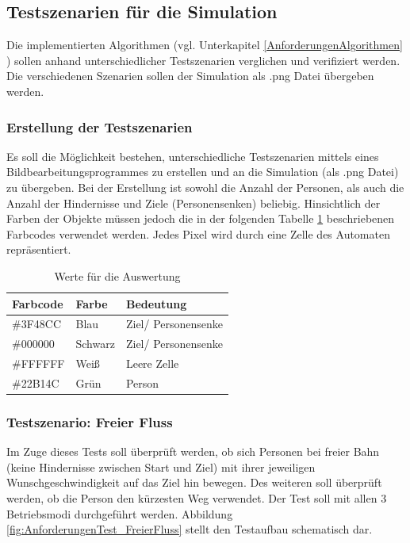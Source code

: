 \subsection{Testszenarien für die Simulation}
\label{AnforderungenTest}

Die implementierten Algorithmen (vgl. Unterkapitel \ref{AnforderungenAlgorithmen} ) sollen anhand unterschiedlicher Testszenarien verglichen und verifiziert werden. Die verschiedenen Szenarien sollen der Simulation als .png Datei übergeben werden. 

\subsubsection{Erstellung der Testszenarien}
Es soll die Möglichkeit bestehen, unterschiedliche Testszenarien mittels eines Bildbearbeitungsprogrammes zu erstellen und an die Simulation (als .png Datei) zu übergeben. Bei der Erstellung ist sowohl die Anzahl der Personen, als auch die Anzahl der Hindernisse und Ziele (Personensenken) beliebig. Hinsichtlich der Farben der Objekte müssen jedoch die in der folgenden Tabelle \ref{tab:Farbcodes} beschriebenen Farbcodes verwendet werden. Jedes Pixel wird durch eine Zelle des Automaten repräsentiert.
 
\begin{table}[htpb]
	\centering
	\begin{tabular}{lll}
		Farbcode & Farbe & Bedeutung\\ \hline
		\#3F48CC & Blau & Ziel/ Personensenke \\	
		\#000000 & Schwarz & Ziel/ Personensenke \\
		\#FFFFFF & Weiß & Leere Zelle \\
		\#22B14C & Grün & Person 
	\end{tabular}
	\caption{Werte für die Auswertung}
	\label{tab:Farbcodes}
\end{table}
 
\subsubsection{Testszenario: Freier Fluss}
Im Zuge dieses Tests soll überprüft werden, ob sich Personen bei freier Bahn (keine Hindernisse zwischen Start und Ziel) mit ihrer jeweiligen Wunschgeschwindigkeit auf das Ziel hin bewegen. Des weiteren soll überprüft werden, ob die Person den kürzesten Weg verwendet. Der Test soll mit allen 3 Betriebsmodi durchgeführt werden. Abbildung \ref{fig:AnforderungenTest_FreierFluss} stellt den Testaufbau schematisch dar.

